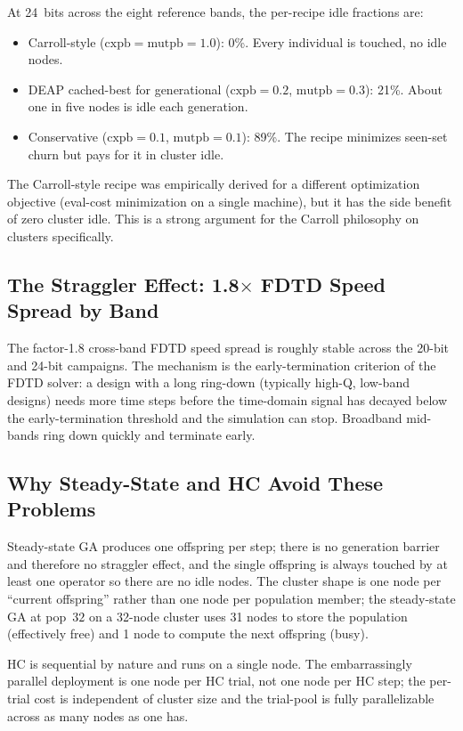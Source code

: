 At 24~bits across the eight reference bands, the per-recipe idle
fractions are:
\begin{itemize}
\item Carroll-style ($\mathrm{cxpb} = \mathrm{mutpb} = 1.0$): 0\%.
      Every individual is touched, no idle nodes.
\item DEAP cached-best for generational ($\mathrm{cxpb} = 0.2$,
      $\mathrm{mutpb} = 0.3$): 21\%. About one in five nodes is
      idle each generation.
\item Conservative ($\mathrm{cxpb} = 0.1$, $\mathrm{mutpb} = 0.1$):
      89\%. The recipe minimizes seen-set churn but pays for it
      in cluster idle.
\end{itemize}
The Carroll-style recipe was empirically derived for a different
optimization objective (eval-cost minimization on a single
machine), but it has the side benefit of zero cluster idle. This
is a strong argument for the Carroll philosophy on clusters
specifically.

\subsection{The Straggler Effect: 1.8$\times$ FDTD Speed Spread by Band}

The factor-1.8 cross-band FDTD speed spread is roughly stable across
the 20-bit and 24-bit campaigns. The mechanism is the early-termination
criterion of the FDTD solver: a design with a long ring-down (typically
high-Q, low-band designs) needs more time steps before the time-domain
signal has decayed below the early-termination threshold and the
simulation can stop. Broadband mid-bands ring down quickly and
terminate early.

\subsection{Why Steady-State and HC Avoid These Problems}

Steady-state GA produces one offspring per step; there is no
generation barrier and therefore no straggler effect, and the
single offspring is always touched by at least one operator so
there are no idle nodes. The cluster shape is one node per
``current offspring'' rather than one node per population member;
the steady-state GA at pop~$32$ on a 32-node cluster uses 31 nodes
to store the population (effectively free) and 1 node to compute
the next offspring (busy).

HC is sequential by nature and runs on a single node. The
embarrassingly parallel deployment is one node per HC trial, not
one node per HC step; the per-trial cost is independent of cluster
size and the trial-pool is fully parallelizable across as many
nodes as one has.

